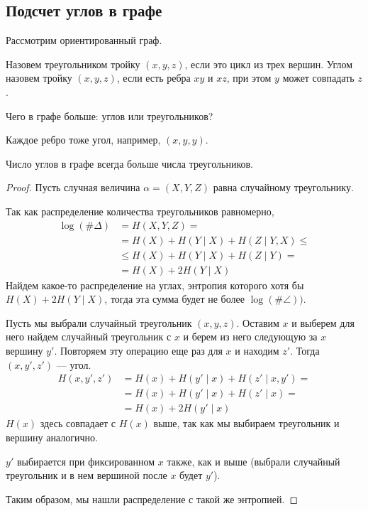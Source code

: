 \subsection{Подсчет углов в графе}
Рассмотрим ориентированный граф.

Назовем треугольником тройку $ (x, y, z)$, если это цикл из трех вершин. Углом назовем тройку  $ (x, y, z)$, если есть ребра  $ xy$ и $xz$, при этом  $ y $ может совпадать  $ z$.

Чего в графе больше: углов или треугольников?
\begin{note}
	Каждое ребро тоже угол, например, $ (x, y, y)$.
\end{note}
\begin{thm}
    Число углов в графе всегда больше числа треугольников.
\end{thm}
\begin{proof}
 	Пусть случная величина $ \alpha = (X, Y, Z)$ равна случайному треугольнику.

	Так как распределение количества треугольников равномерно,
	\begin{align*}
		\log (\# \Delta)& = H(X, Y, Z)  = \tag{Chain rule} \\
					  &= H(X) + H(Y \mid  X) + H(Z \mid  Y, X) \le  \\
					  & \le  H(X) + H(Y \mid X) + H(Z \mid Y) = \tag{циклический сдвиг в треугольнике} \\
		 & = H(X) + 2 H(Y \mid X)
	\end{align*}
Найдем какое-то распределение на углах, энтропия которого хотя бы $ H(X) + 2H(Y \mid X)$, тогда эта сумма будет не более  $  \log (\# \angle)) $.

	Пусть мы выбрали случайный треугольник $ (x, y, z)$. Оставим $ x$ и выберем для него найдем случайный треугольник с $ x$ и берем из него следующую за $ x$ вершину $ y'$. Повторяем эту операцию еще раз для $ x$ и находим  $ z'$. Тогда $ (x,  y', z')$ --- угол.
	\begin{align*}
		H(x, y', z') & = H(x) + H(y' \mid x) + H(z' \mid x, y') = \tag{Так как $ y'$ и  $ z'$ независимы при выбранном  $ x$}  \\
					 & =H(x) + H(y'\mid x) + H(z' \mid x) = \tag{Выбор аналогичный} \\
					 & = H(x) + 2 H(y' \mid x)
	\end{align*}
	$ H(x)$ здесь совпадает с  $ H(x) $ выше, так как мы выбираем треугольник и вершину аналогично.

	$ y'$ выбирается при фиксированном  $ x$ также, как и выше (выбрали случайный треугольник и в нем вершиной после $ x$ будет  $ y'$).

	Таким образом, мы нашли распределение с такой же энтропией.
\end{proof}

